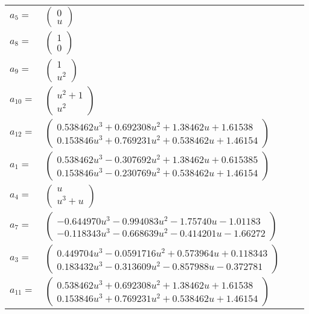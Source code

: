 \documentclass[1p]{elsarticle_modified}
\theoremstyle{definition}
\begin{document}
\begin{tabular}{m{7pt} m{180pt} m{7pt} m{180pt} }
\flushright $a_{5}=$&$\begin{pmatrix}0\\u\end{pmatrix}$ \\
\flushright $a_{8}=$&$\begin{pmatrix}1\\0\end{pmatrix}$ \\
\flushright $a_{9}=$&$\begin{pmatrix}1\\u^2\end{pmatrix}$ \\
\flushright $a_{10}=$&$\begin{pmatrix}u^2+1\\u^2\end{pmatrix}$ \\
\flushright $a_{12}=$&$\begin{pmatrix}0.538462 u^{3}+0.692308 u^{2}+1.38462 u+1.61538\\0.153846 u^{3}+0.769231 u^{2}+0.538462 u+1.46154\end{pmatrix}$ \\
\flushright $a_{1}=$&$\begin{pmatrix}0.538462 u^{3}-0.307692 u^{2}+1.38462 u+0.615385\\0.153846 u^{3}-0.230769 u^{2}+0.538462 u+1.46154\end{pmatrix}$ \\
\flushright $a_{4}=$&$\begin{pmatrix}u\\u^3+u\end{pmatrix}$ \\
\flushright $a_{7}=$&$\begin{pmatrix}-0.644970 u^{3}-0.994083 u^{2}-1.75740 u-1.01183\\-0.118343 u^{3}-0.668639 u^{2}-0.414201 u-1.66272\end{pmatrix}$ \\
\flushright $a_{3}=$&$\begin{pmatrix}0.449704 u^{3}-0.0591716 u^{2}+0.573964 u+0.118343\\0.183432 u^{3}-0.313609 u^{2}-0.857988 u-0.372781\end{pmatrix}$ \\
\flushright $a_{11}=$&$\begin{pmatrix}0.538462 u^{3}+0.692308 u^{2}+1.38462 u+1.61538\\0.153846 u^{3}+0.769231 u^{2}+0.538462 u+1.46154\end{pmatrix}$ \\

\end{tabular}
\end{document}
